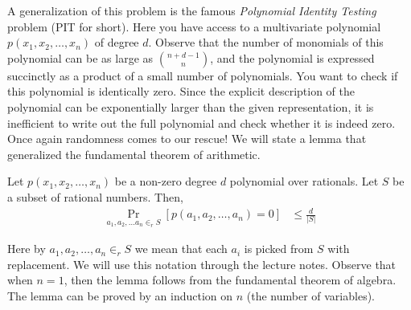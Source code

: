 A generalization of this problem is the famous \textit{Polynomial Identity Testing} problem (PIT for short). Here you have access to a multivariate polynomial $p(x_1, x_2, \ldots, x_n)$ of degree $d$. Observe that the number of monomials of this polynomial can be as large as $\binom{n+d-1}{n}$, and the polynomial is expressed succinctly as a product of a small number of polynomials. You want to check if this polynomial is identically zero. Since the explicit description of the polynomial can be exponentially larger than the given representation, it is inefficient to write out the full polynomial and check whether it is indeed zero. Once again randomness comes to our rescue! We will state a lemma that generalized the fundamental theorem of arithmetic.

\begin{lemma}
	Let $p(x_1, x_2, \ldots, x_n)$ be a non-zero degree $d$ polynomial over rationals. Let $S$ be a subset of rational numbers. Then,
	\begin{align*}
		\Pr_{a_1, a_2, \ldots a_n \in_r S} \left[ p(a_1, a_2, \ldots, a_n) = 0  \right] &\leq \frac{d}{|S|}
	\end{align*} 
\end{lemma}

Here by ${a_1, a_2, \ldots, a_n \in_r S}$ we mean that each $a_i$ is picked from $S$ with replacement. We will use this notation through the lecture notes. Observe that when $n=1$, then the lemma follows from the fundamental theorem of algebra. The lemma can be proved by an induction on $n$ (the number of variables).
